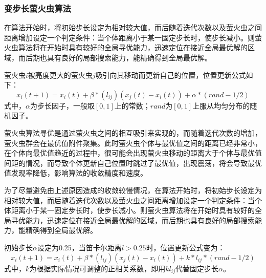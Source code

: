 \documentclass[UTF8]{ctexart}
\begin{document}
			\subsubsection{变步长萤火虫算法}
				在算法开始时，将初始步长设定为相对较大值，而后随着迭代次数以及萤火虫之间距离增加设定一个判定条件：当个体距离小于某一固定步长时，使步长减小。则萤火虫算法将在开始时具有较好的全局寻优能力，迅速定位在接近全局最优解的区域，而后期也具有良好的局部搜索能力，能精确得到全局最优解。
				\par 萤火虫$i$被亮度更大的萤火虫$j$吸引向其移动而更新自己的位置，位置更新公式如下：
					$$x_i(t+1)=x_i(t)+\beta*(l_{ij})(x_j(t)-x_i(t))+\alpha*(rand-1/2)$$
				式中，$\alpha$为步长因子，一般取$[0,1]$上的常数；$rand$为$[0,1]$上服从均匀分布的随机因子。
				\par 萤火虫算法寻优是通过萤火虫之间的相互吸引来实现的，而随着迭代次数的增加，萤火虫群会在最优值附件聚集。此时萤火虫个体与最优值之间的距离已经非常小，在个体向最优值趋近的过程中，很可能会出现萤火虫移动的距离大于个体与最优值间距的情况，而导致个体更新自己位置时跳过了最优值，出现震荡，将会导致最优值发现率降低，影响算法的收敛精度和速度。
				\par 为了尽量避免由上述原因造成的收敛较慢情况，在算法开始时，将初始步长设定为相对较大值，而后随着迭代次数以及萤火虫之间距离增加设定一个判定条件：当个体距离小于某一固定步长时，使步长减小。则萤火虫算法将在开始时具有较好的全局寻优能力，迅速定位在接近全局最优解的区域，而后期也具有良好的局部搜索能力，能精确得到全局最优解。
				\par 初始步长$\alpha$设定为0.25，当笛卡尔距离$l>0.25$时，位置更新公式变为：
						$$x_i(t+1)=x_i(t)+\beta*(l_{ij})(x_j(t)-x_i(t))+k*l_{ij}*(rand-1/2)$$
					式中，$k$为根据实际情况可调整的正相关系数，即用$kl_{ij}$代替固定步长$\alpha$。
\end{document}
